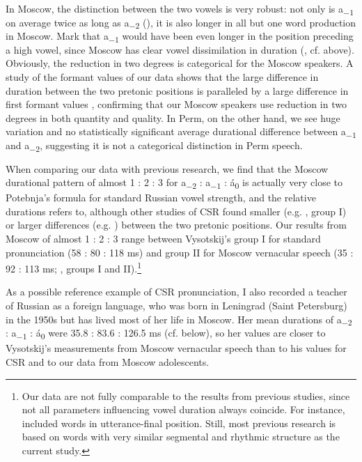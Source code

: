 \documentclass[output=paper]{langscibook}
\begin{document}
In Moscow, the distinction between the two vowels is very robust: not only is a\textsubscript{$-1$} on average twice as long as a\textsubscript{$-2$} (), it is also longer in all but one word production in Moscow. Mark that a\textsubscript{$-1$} would have been even longer in the position preceding a high vowel, since Moscow has clear vowel dissimilation in duration (\citealt{Kasatkina2005}, cf.  above). Obviously, the reduction in two degrees is categorical for the Moscow speakers. A study of the formant values of our data shows that the large difference in duration between the two pretonic positions is paralleled by a large difference in first formant values \citep{postaccepted}, confirming that our Moscow speakers use reduction in two degrees in both quantity and quality. In Perm, on the other hand, we see huge variation and no statistically significant average durational difference between a\textsubscript{$-1$} and a\textsubscript{$-2$}, suggesting it is not a categorical distinction in Perm speech.



When comparing our data with previous research, we find that the Moscow durational pattern of almost 1 : 2 : 3 for a\textsubscript{$-2$} : a\textsubscript{$-1$} : á\textsubscript{0} is actually very close to Potebnja’s formula for standard Russian vowel strength, and the relative durations \citet{Bondarko1998} refers to, although other studies of CSR found smaller (e.g. \citealt{Vysotskij1973}, group I) or larger differences (e.g. \citealt{Barnes2006}) between the two pretonic positions. Our results from Moscow of almost 1 : 2 : 3 range between Vysotskij’s group I for standard pronunciation (58 : 80 : 118 ms) and group II for Moscow vernacular speech (35 : 92 : 113 ms; , groups I and II).\footnote{Our data are not fully comparable to the results from previous studies, since not all parameters influencing vowel duration always coincide. For instance, \citet{Vysotskij1973} included words in utterance-final position. Still, most previous research is based on words with very similar segmental and rhythmic structure as the current study.}


\begin{sloppypar}
As a possible reference example of CSR pronunciation, I also recorded a teacher of Russian as a foreign language, who was born in Leningrad (Saint Petersburg) in the 1950s but has lived most of her life in Moscow. Her mean durations of a\textsubscript{$-2$} : a\textsubscript{$-1$} : á\textsubscript{0} were 35.8 : 83.6 : 126.5 ms (cf.  below), so her values are closer to Vysotskij’s measurements from Moscow vernacular speech than to his values for CSR and to our data from Moscow adolescents.
\end{sloppypar}
\end{document}
